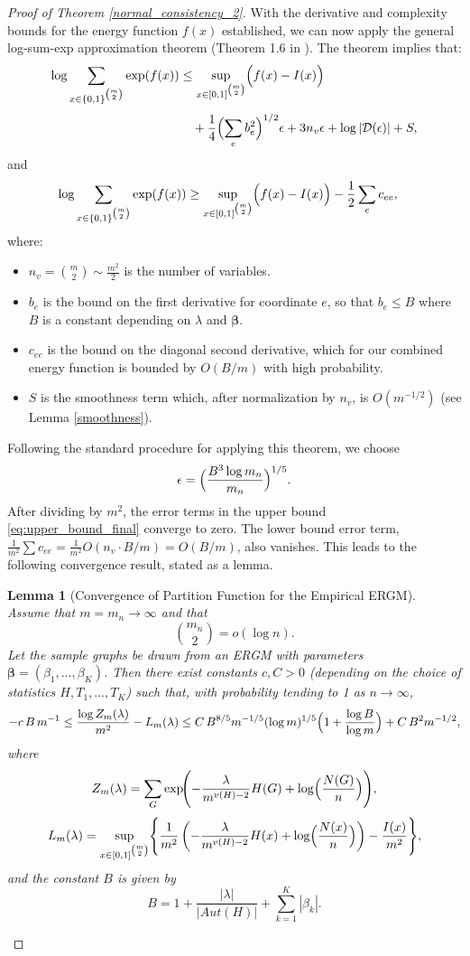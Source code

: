 \documentclass[12pt]{article}
\numberwithin{equation}{section}
\newtheorem{lemma}{Lemma}[section]
\def\bbeta{\boldsymbol{\beta}}
\begin{document}
\begin{proof}[Proof of Theorem \ref{normal_consistency_2}]
With the derivative and complexity bounds for the energy function $f(x)$ established, we can now apply the general log-sum-exp approximation theorem (Theorem 1.6 in \cite{chatterjee2016nonlinear}). The theorem implies that:
\begin{align}
\log \sum_{x\in\{0,1\}^{\binom{m}{2}}}\exp(f(x))
&\le \sup_{x\in[0,1]^{\binom{m}{2}}}\Bigl(f(x)-I(x)\Bigr) \nonumber\\[1mm]
&\quad + \frac{1}{4}\Bigl(\sum_{e}b_e^2\Bigr)^{1/2}\epsilon
+3n_v\epsilon + \log |\mathcal{D}(\epsilon)| + S, \label{eq:upper_bound_final}
\end{align}
and
\begin{align}
\log \sum_{x\in\{0,1\}^{\binom{m}{2}}}\exp(f(x))
&\ge \sup_{x\in[0,1]^{\binom{m}{2}}}\Bigl(f(x)-I(x)\Bigr) - \frac{1}{2}\sum_{e} c_{ee}, \label{eq:lower_bound_final}
\end{align}
where:
\begin{itemize}
  \item \(n_v=\binom{m}{2}\sim \frac{m^2}{2}\) is the number of variables.
  \item \(b_e\) is the bound on the first derivative for coordinate \(e\), so that \(b_e\le B\) where $B$ is a constant depending on $\lambda$ and $\bbeta$.
  \item \(c_{ee}\) is the bound on the diagonal second derivative, which for our combined energy function is bounded by \(O(B/m)\) with high probability.
  \item \(S\) is the smoothness term which, after normalization by \(n_v\), is \(O(m^{-1/2})\) (see Lemma \ref{smoothness}).
\end{itemize}
Following the standard procedure for applying this theorem, we choose
\[
\epsilon = \Bigl(\frac{B^3\log m_n}{m_n}\Bigr)^{1/5}.
\]
After dividing by \(m^2\), the error terms in the upper bound \eqref{eq:upper_bound_final} converge to zero. The lower bound error term, $\frac{1}{m^2}\sum c_{ee} = \frac{1}{m^2} O(n_v \cdot B/m) = O(B/m)$, also vanishes. This leads to the following convergence result, stated as a lemma.


\begin{lemma}[Convergence of Partition Function for the Empirical ERGM]
\label{lem:partition_func_conv_gen}
Assume that \(m=m_n\to\infty\) and that
\[
\binom{m_n}{2}=o(\log n).
\]
Let the sample graphs be drawn from an ERGM with parameters $\bbeta = (\beta_1, \dots, \beta_K)$. Then there exist constants \(c,C>0\) (depending on the choice of statistics $H, T_1, \dots, T_K$) such that, with probability tending to 1 as \(n\to\infty\),
\[
-c\,B\, m^{-1} \le \frac{\log Z_m(\lambda)}{m^2} - L_m(\lambda) \le C\,B^{8/5} m^{-1/5} (\log m)^{1/5}\Bigl(1+\frac{\log B}{\log m}\Bigr) + C\,B^2 m^{-1/2},
\]
where
\[
Z_m(\lambda) =\sum_{G}\exp\!\Biggl(-\frac{\lambda}{m^{v(H)-2}}H(G) + \log\Bigl(\frac{N(G)}{n}\Bigr)\Biggr),
\]
\[
L_m(\lambda) = \sup_{x\in[0,1]^{\binom{m}{2}}}\Biggl\{\frac{1}{m^2}\left(-\frac{\lambda}{m^{v(H)-2}}H(x)+\log\Bigl(\frac{N(x)}{n}\Bigr)\right)-\frac{I(x)}{m^2}\Biggr\},
\]
and the constant $B$ is given by
\[
B = 1+\frac{|\lambda|}{\lvert Aut(H)\rvert}+\sum_{k=1}^K |\beta_k|.
\]
\end{lemma}



\end{proof}
\end{document}

